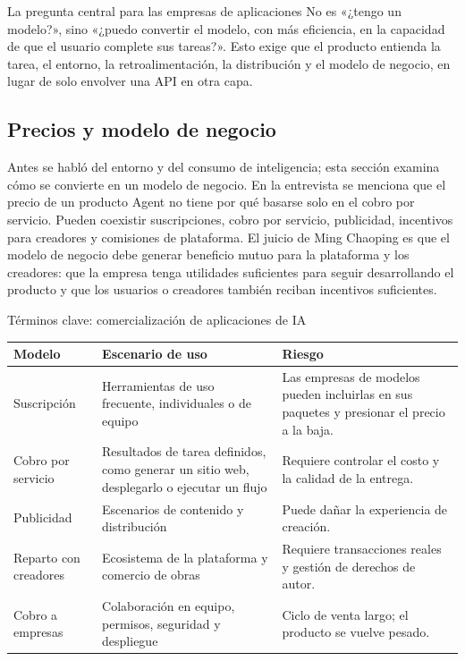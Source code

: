 \begin{importantbox}{La pregunta central para las empresas de aplicaciones}
No es «¿tengo un modelo?», sino «¿puedo convertir el modelo, con más eficiencia, en la capacidad de que el usuario complete sus tareas?». Esto exige que el producto entienda la tarea, el entorno, la retroalimentación, la distribución y el modelo de negocio, en lugar de solo envolver una API en otra capa.
\end{importantbox}

\subsection{Precios y modelo de negocio}

Antes se habló del entorno y del consumo de inteligencia; esta sección examina cómo se convierte en un modelo de negocio. En la entrevista se menciona que el precio de un producto Agent no tiene por qué basarse solo en el cobro por servicio. Pueden coexistir suscripciones, cobro por servicio, publicidad, incentivos para creadores y comisiones de plataforma. El juicio de Ming Chaoping es que el modelo de negocio debe generar beneficio mutuo para la plataforma y los creadores: que la empresa tenga utilidades suficientes para seguir desarrollando el producto y que los usuarios o creadores también reciban incentivos suficientes.

\begin{knowledgebox}{Términos clave: comercialización de aplicaciones de IA}
\noindent\begin{tabularx}{\textwidth}{p{}p{}X}
\toprule
Modelo & Escenario de uso & Riesgo \\
\midrule
Suscripción & Herramientas de uso frecuente, individuales o de equipo & Las empresas de modelos pueden incluirlas en sus paquetes y presionar el precio a la baja. \\
Cobro por servicio & Resultados de tarea definidos, como generar un sitio web, desplegarlo o ejecutar un flujo & Requiere controlar el costo y la calidad de la entrega. \\
Publicidad & Escenarios de contenido y distribución & Puede dañar la experiencia de creación. \\
Reparto con creadores & Ecosistema de la plataforma y comercio de obras & Requiere transacciones reales y gestión de derechos de autor. \\
Cobro a empresas & Colaboración en equipo, permisos, seguridad y despliegue & Ciclo de venta largo; el producto se vuelve pesado. \\
\bottomrule
\end{tabularx}
\end{knowledgebox}

